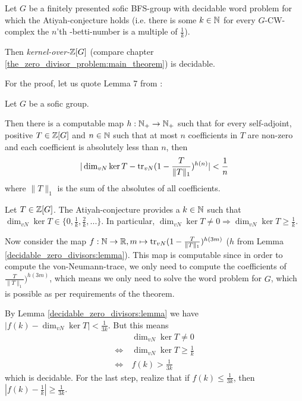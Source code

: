 \begin{Theorem}
	\label{decidable_zero_divisors:theorem}
	Let $G$ be a finitely presented sofic BFS-group with decidable word problem for which the Atiyah-conjecture holds (i.e. there is some $k \in \mathbb{N}$ for every $G$-CW-complex the $n$'th \ltwo-betti-number is a multiple of $\frac1k$).

	Then \emph{kernel-over-$\mathbb{Z}[G]$} (compare chapter \ref{the_zero_divisor_problem:main_theorem}) is decidable.
\end{Theorem}
For the proof, let us quote Lemma 7 from \cite{gra14-2}:
\begin{Lemma}
		\label{decidable_zero_divisors:lemma}
	Let $G$ be a sofic group.

	Then there is a computable map $h: \mathbb{N}_+ \to \mathbb{N}_+$ such that for every self-adjoint, positive $T \in \mathbb{Z}[G]$ and $n \in \mathbb{N}$ such that at most $n$ coefficients in $T$ are non-zero and each coefficient is absolutely less than $n$, then
	\begin{align*}
		| \dim_{vN} \ker T - \operatorname{tr}_{vN}(1 - \frac{T}{\|T\|_1})^{h(n)} | < \frac{1}{n}
	\end{align*}
	where $\|T\|_1$ is the sum of the absolutes of all coefficients.
\end{Lemma}
	Let $T \in \mathbb{Z}[G]$.
	The Atiyah-conjecture provides a $k \in \mathbb{N}$ such that $\dim_{vN} \ker T \in \{0, \frac{1}{k},\frac{2}{k},...\}$. %
	In particular, $\dim_{vN} \ker T \neq 0 \Rightarrow \dim_{vN} \ker T \geq \frac1k$.

	Now consider the map $f:\mathbb{N} \to \mathbb{R}, m \mapsto \operatorname{tr}_{vN}(1 - \frac{T}{\|T\|_1})^{h(3m)}$ ($h$ from Lemma \ref{decidable_zero_divisors:lemma}).
	This map is computable since in order to compute the von-Neumann-trace, we only need to compute the coefficients of $\frac{T}{\|T\|_1})^{h(3m)}$, which means we only need to solve the word problem for $G$, which is possible as per requirements of the theorem.

	By Lemma \ref{decidable_zero_divisors:lemma} we have $|f(k) - \dim_{vN} \ker T| < \frac{1}{3k}$. But this means
	\begin{align*}
		& \dim_{vN} \ker T \neq 0 \\
		\iff~& \dim_{vN} \ker T \geq \frac1k \\
		\iff~& f(k) > \frac{1}{3k}
	\end{align*}
	which is decidable. For the last step, realize that if $f(k) \leq \frac{1}{3k}$, then $|f(k) - \frac1k| \geq \frac{1}{3k}$.
\endproof
